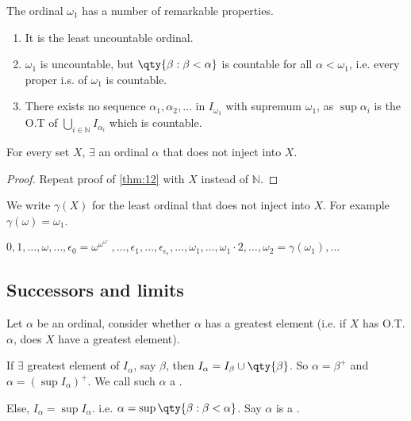 The ordinal $\omega_1$ has a number of remarkable properties.
\begin{enumerate}
    \item It is the least uncountable ordinal.
    \item $\omega_1$ is uncountable, but $\qty{\beta : \beta < \alpha}$ is countable for all $\alpha < \omega_1$, i.e. every proper i.s. of $\omega_1$ is countable.
    \item There exists no sequence $\alpha_1, \alpha_2, \dots$ in $I_{\omega_1}$ with supremum $\omega_1$, as $\sup{\alpha_i}$ is the O.T of $\bigcup_{i \in \mathbb{N}} I_{\alpha_i}$ which is countable.
\end{enumerate}

\begin{theorem}
    For every set $X$, $\exists$ an ordinal $\alpha$ that does not inject into $X$.
\end{theorem}

\begin{proof}
    Repeat proof of \cref{thm:12} with $X$ instead of $\mathbb{N}$.
\end{proof}

\begin{remark}
    We write $\gamma(X)$ for the least ordinal that does not inject into $X$.
    For example $\gamma(\omega) = \omega_1$.

    $0, 1, \dots, \omega, \dots, \epsilon_0 = \omega^{\omega^{\omega^{\dots}}}, \dots, \epsilon_1, \dots, \epsilon_{\epsilon_{\epsilon}}, \dots, \omega_1, \dots, \omega_1 \cdot 2, \dots, \omega_2 = \gamma(\omega_1), \dots$
\end{remark}

\subsection{Successors and limits}

Let $\alpha$ be an ordinal, consider whether $\alpha$ has a greatest element (i.e. if $X$ has O.T. $\alpha$, does $X$ have a greatest element).
\begin{definition}[Successor]
    If $\exists$ greatest element of $I_\alpha$, say $\beta$, then $I_\alpha = I_\beta \cup \qty{\beta}$.
    So $\alpha = \beta^+$ and $\alpha = (\sup I_\alpha)^+$.
    We call such $\alpha$ a .

    Else, $I_\alpha = \sup I_\alpha$. i.e. $\alpha = \sup \qty{\beta : \beta < \alpha}$.
    Say $\alpha$ is a .
\end{definition}

